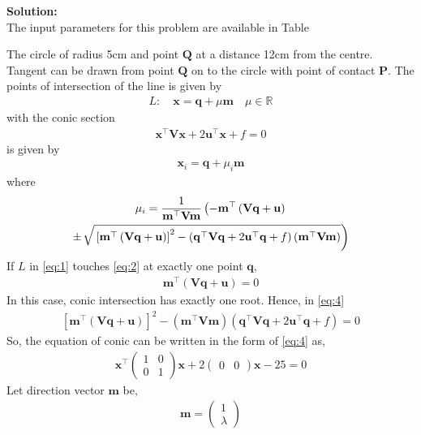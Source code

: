 \documentclass[12pt]{article}
\providecommand{\sbrak}[1]{\ensuremath{{}\left[#1\right]}}
\providecommand{\brak}[1]{\ensuremath{\left(#1\right)}}
\providecommand{\lbrak}[1]{\ensuremath{\left(#1\right.}}
\providecommand{\rbrak}[1]{\ensuremath{\left.#1\right)}}
\providecommand{\brak}[1]{\ensuremath{\left(#1\right)}}
\newcommand{\solution}{\noindent \textbf{Solution: }}
\newcommand{\myvec}[1]{\ensuremath{\begin{pmatrix}#1\end{pmatrix}}}
\let\vec\mathbf
\begin{document}
\begin{enumerate}
\solution \\The input parameters for this problem are available in Table %
\begin{table}[ht!]\centering

\caption{}
\label{Table-1} 
\end{table}
The circle of radius 5cm and point $\vec{Q}$ at a distance 12cm from the centre. Tangent can be drawn from point $\vec{Q}$ on to the circle with point of contact $\vec{P}$.
The points of intersection of the line is given by
\begin{align}
	L: \quad \vec{x} = \vec{q} + \mu \vec{m} \quad \mu \in \mathbb{R}\label{eq:1}
\end{align}
with the conic section
\begin{align}
	\vec{x}^{\top}\vec{V}\vec{x}+2\vec{u}^{\top}\vec{x}+f=0\label{eq:2}
\end{align}
is given by
\begin{align}
	\vec{x}_i = \vec{q} + \mu_i \vec{m}\label{eq:3}
\end{align}
where
\begin{multline}
\mu_i = \frac{1}{\vec{m}^{\top}\vec{V}\vec{m}}
	\lbrak{-\vec{m}^{\top}\brak{\vec{V}\vec{q}+\vec{u}}}\\ \pm {\small \rbrak{\sqrt{\sbrak{\vec{m}^{\top}\brak{\vec{V}\vec{q}+\vec{u}}}^2-\brak{\vec{q}^{\top}\vec{V}\vec{q} + 2\vec{u}^{\top}\vec{q} +f}\brak{\vec{m}^{\top}\vec{V}\vec{m}}}}}\label{eq:4}
\end{multline}
If $L$ in \eqref{eq:1} touches \eqref{eq:2} at exactly one point $\vec{q}$, 
\begin{align}
  \vec{m}^{\top}\brak{\vec{V}\vec{q}+\vec{u}} = 0
\end{align}
		In this case, conic intersection has exactly one root.  Hence, in \eqref{eq:4}
  \begin{align}
  \sbrak{
  \vec{m}^{\top}\brak{\vec{V}\vec{q}+\vec{u}}
  }^2 -\brak{\vec{m}^{\top}\vec{V}\vec{m}}
  \brak
  {
\vec{q}^{\top}\vec{V}\vec{q} + 2\vec{u}^{\top}\vec{q} +f
	  } = 0\label{eq:6}
  \end{align}    
		So, the equation of conic can be written in the form of \eqref{eq:4} as,
\begin{align}
	\vec{x}^{\top}\myvec{1&0\\0&1}\vec{x}+2\myvec{0&0}\vec{x}-25=0 \label{eq:7}
\end{align}
		Let direction vector $\vec{m}$ be,
\begin{align}
	\vec{m}=\myvec{1 \\ \lambda}\label{eq:8}

\end{align}
\end{enumerate}
\end{document}
